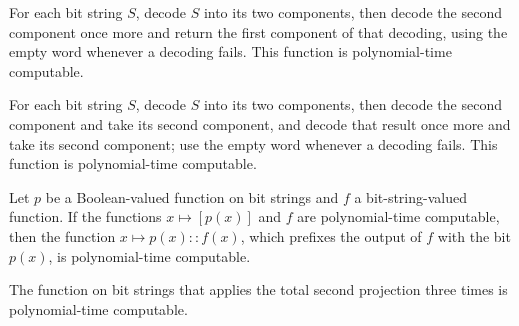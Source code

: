 \begin{theorem}
\label{Complexity.BinArith.polyTimeComputable_slot2}
\leanok
{}
For each bit string $S$, decode $S$ into its two components, then decode the second
component once more and return the first component of that decoding, using the empty
word whenever a decoding fails. This function is polynomial-time computable.
\end{theorem}

\begin{theorem}
\label{Complexity.BinArith.polyTimeComputable_slot3}
\leanok
{}
For each bit string $S$, decode $S$ into its two components, then decode the second
component and take its second component, and decode that result once more and take its
second component; use the empty word whenever a decoding fails. This function is
polynomial-time computable.
\end{theorem}

\begin{theorem}
\label{Complexity.BinArith.polyTimeComputable_cons}
\leanok
{}
Let $p$ be a Boolean-valued function on bit strings and $f$ a bit-string-valued
function. If the functions $x\mapsto[p(x)]$ and $f$ are polynomial-time computable, then
the function $x\mapsto p(x)::f(x)$, which prefixes the output of $f$ with the bit
$p(x)$, is polynomial-time computable.
\end{theorem}

\begin{theorem}
\label{Complexity.BinArith.polyTimeComputable_slot4}
\leanok
{}
The function on bit strings that applies the total second projection three times is
polynomial-time computable.
\end{theorem}

